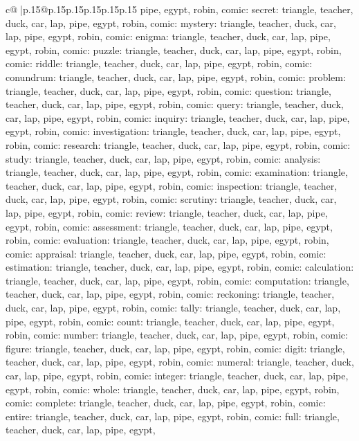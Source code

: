 \documentclass{article}
\begin{document}
{\begin{supertabular}{c@{$\;$}|p{.15\linewidth}@{}p{.15\linewidth}p{.15\linewidth}p{.15\linewidth}p{.15\linewidth}p{.15\linewidth}}
{{{pipe, egypt, robin, comic\n\nCLUE: secret\nTARGETS: triangle, teacher, duck, car, lap, pipe, egypt, robin, comic\n\nCLUE: mystery\nTARGETS: triangle, teacher, duck, car, lap, pipe, egypt, robin, comic\n\nCLUE: enigma\nTARGETS: triangle, teacher, duck, car, lap, pipe, egypt, robin, comic\n\nCLUE: puzzle\nTARGETS: triangle, teacher, duck, car, lap, pipe, egypt, robin, comic\n\nCLUE: riddle\nTARGETS: triangle, teacher, duck, car, lap, pipe, egypt, robin, comic\n\nCLUE: conundrum\nTARGETS: triangle, teacher, duck, car, lap, pipe, egypt, robin, comic\n\nCLUE: problem\nTARGETS: triangle, teacher, duck, car, lap, pipe, egypt, robin, comic\n\nCLUE: question\nTARGETS: triangle, teacher, duck, car, lap, pipe, egypt, robin, comic\n\nCLUE: query\nTARGETS: triangle, teacher, duck, car, lap, pipe, egypt, robin, comic\n\nCLUE: inquiry\nTARGETS: triangle, teacher, duck, car, lap, pipe, egypt, robin, comic\n\nCLUE: investigation\nTARGETS: triangle, teacher, duck, car, lap, pipe, egypt, robin, comic\n\nCLUE: research\nTARGETS: triangle, teacher, duck, car, lap, pipe, egypt, robin, comic\n\nCLUE: study\nTARGETS: triangle, teacher, duck, car, lap, pipe, egypt, robin, comic\n\nCLUE: analysis\nTARGETS: triangle, teacher, duck, car, lap, pipe, egypt, robin, comic\n\nCLUE: examination\nTARGETS: triangle, teacher, duck, car, lap, pipe, egypt, robin, comic\n\nCLUE: inspection\nTARGETS: triangle, teacher, duck, car, lap, pipe, egypt, robin, comic\n\nCLUE: scrutiny\nTARGETS: triangle, teacher, duck, car, lap, pipe, egypt, robin, comic\n\nCLUE: review\nTARGETS: triangle, teacher, duck, car, lap, pipe, egypt, robin, comic\n\nCLUE: assessment\nTARGETS: triangle, teacher, duck, car, lap, pipe, egypt, robin, comic\n\nCLUE: evaluation\nTARGETS: triangle, teacher, duck, car, lap, pipe, egypt, robin, comic\n\nCLUE: appraisal\nTARGETS: triangle, teacher, duck, car, lap, pipe, egypt, robin, comic\n\nCLUE: estimation\nTARGETS: triangle, teacher, duck, car, lap, pipe, egypt, robin, comic\n\nCLUE: calculation\nTARGETS: triangle, teacher, duck, car, lap, pipe, egypt, robin, comic\n\nCLUE: computation\nTARGETS: triangle, teacher, duck, car, lap, pipe, egypt, robin, comic\n\nCLUE: reckoning\nTARGETS: triangle, teacher, duck, car, lap, pipe, egypt, robin, comic\n\nCLUE: tally\nTARGETS: triangle, teacher, duck, car, lap, pipe, egypt, robin, comic\n\nCLUE: count\nTARGETS: triangle, teacher, duck, car, lap, pipe, egypt, robin, comic\n\nCLUE: number\nTARGETS: triangle, teacher, duck, car, lap, pipe, egypt, robin, comic\n\nCLUE: figure\nTARGETS: triangle, teacher, duck, car, lap, pipe, egypt, robin, comic\n\nCLUE: digit\nTARGETS: triangle, teacher, duck, car, lap, pipe, egypt, robin, comic\n\nCLUE: numeral\nTARGETS: triangle, teacher, duck, car, lap, pipe, egypt, robin, comic\n\nCLUE: integer\nTARGETS: triangle, teacher, duck, car, lap, pipe, egypt, robin, comic\n\nCLUE: whole\nTARGETS: triangle, teacher, duck, car, lap, pipe, egypt, robin, comic\n\nCLUE: complete\nTARGETS: triangle, teacher, duck, car, lap, pipe, egypt, robin, comic\n\nCLUE: entire\nTARGETS: triangle, teacher, duck, car, lap, pipe, egypt, robin, comic\n\nCLUE: full\nTARGETS: triangle, teacher, duck, car, lap, pipe, egypt, }}}
\end{supertabular}}
\end{document}
